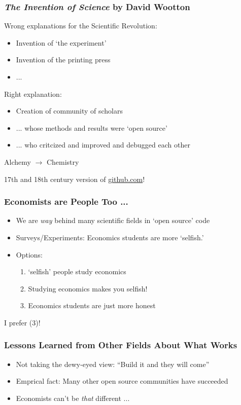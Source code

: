 \documentclass[public]{beamer}
\begin{document}
\begin{frame}
\frametitle{{\it The Invention of Science} by David Wootton}

Wrong explanations for the Scientific Revolution: \pause 
\begin{itemize}
\item Invention of `the experiment'
\item Invention of the printing press
\item ... 
\end{itemize}
\medskip\medskip

\pause 
Right explanation:
\begin{itemize}
\item Creation of community of scholars
\item ... whose methods and results were `open source'
\item ... who critcized and improved and debugged each other
\end{itemize}

\medskip
\pause
Alchemy $\rightarrow$ Chemistry

\medskip
\pause 
17th and 18th century version of \href{http://github.com}{github.com}!

\end{frame}

\begin{frame}
\frametitle{Economists are People Too ...}

\begin{itemize}
\item We are {\it way} behind many scientific fields in `open source' code
\item Surveys/Experiments: Economics students are more `selfish.'
\item Options: \pause
\begin{enumerate}
\item `selfish' people study economics
\item Studying economics makes you selfish!
\item Economics students are just more honest
\end{enumerate}
\end{itemize}

\pause I prefer (3)!

\end{frame}

\begin{frame}
\frametitle{Lessons Learned from Other Fields About What Works}

\begin{itemize}
\item Not taking the dewy-eyed view: ``Build it and they will come''
\item Emprical fact: Many other open source communities have succeeded
\item Economists can't be {\it that} different ...
\end{itemize}

\end{frame}
\end{document}
